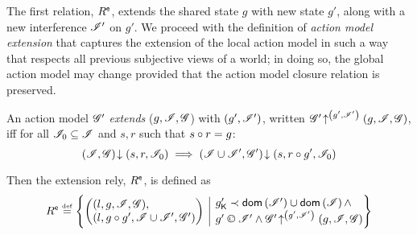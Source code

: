 The first relation, $R^{\textsf{e}}$, extends the shared state $g$ with new state $g'$, along with a new interference $\mathscr{I}'$ on $g'$. We proceed with the definition of \emph{action model extension} that captures the extension of the local action model in such a way that respects all previous subjective views of a world; in doing so, the global action model may change provided that the action model closure relation is preserved.
%
%
\begin{definition}\label{def:amodExtension}
An action model $\mathscr{G}'$ \emph{extends} ($g, \mathscr{I}, \mathscr{G}$) with
$(g', \mathscr{I}')$, written
$\mathscr{G}' \!\uparrow^{\left(g', \mathscr{I}'\right)} \left(g, \mathscr{I}, \mathscr{G}\right)$, iff for all
$\mathscr{I}_0 \subseteq \mathscr{I}$ and $s, r$ such that $s \circ r = g$:
\[
\left(\mathscr{I}, \mathscr{G}\right) \!\downarrow \left(s, r, \mathscr{I}_0\right) \implies \left(\mathscr{I} \cup \mathscr{I}', \mathscr{G}'\right) \!\downarrow \left(s, r\circ g', \mathscr{I}_0\right)
\]
\end{definition}
%
%
Then the extension rely, $R^{\textsf{e}}$, is defined as
%
\[
  \extendR \eqdef
  \left\{
  \begin{array}{@{} l @{\hspace{5pt}} | @{\hspace{5pt}} l @{}}
    \left(
    \begin{array}{@{} l @{}}
      (l , g, \lmod, \gmod),\\
      (l, g \composeL g', \lmod \cup \lmod', \gmod')
    \end{array}
    \right)
    &
    \begin{array}{@{} l @{}}
      \capPart{g'} \containedIn \dom{\lmod'} \cup \dom{\lmod} \land \\
      	g' \containI \lmod' \land
      \expandsAM{\gmod'}{g'}{\lmod'}{g}{\lmod}{\gmod}
    \end{array}
  \end{array}
  \right\}
\]


